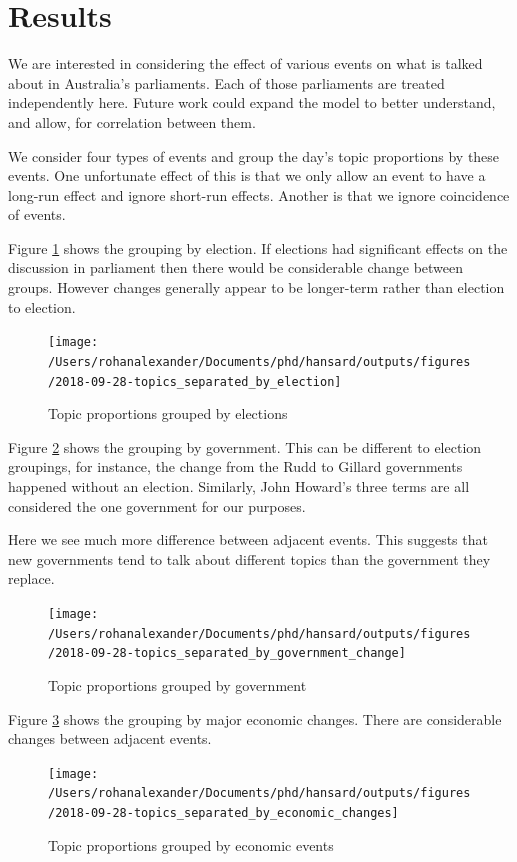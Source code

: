 \documentclass[12pt,]{article}
\theoremstyle{definition}
\theoremstyle{definition}
\theoremstyle{definition}
\theoremstyle{remark}
\begin{document}
\section{Results}\label{results}

We are interested in considering the effect of various events on what is
talked about in Australia's parliaments. Each of those parliaments are
treated independently here. Future work could expand the model to better
understand, and allow, for correlation between them.

We consider four types of events and group the day's topic proportions
by these events. One unfortunate effect of this is that we only allow an
event to have a long-run effect and ignore short-run effects. Another is
that we ignore coincidence of events.

Figure \ref{fig:electionsevents} shows the grouping by election. If
elections had significant effects on the discussion in parliament then
there would be considerable change between groups. However changes
generally appear to be longer-term rather than election to election.

\begin{figure}
\texttt{[image: /Users/rohanalexander/Documents/phd/hansard/outputs/figures/2018-09-28-topics\_separated\_by\_election]} \caption{Topic proportions grouped by elections}\label{fig:electionsevents}
\end{figure}

Figure \ref{fig:governmentevents} shows the grouping by government. This
can be different to election groupings, for instance, the change from
the Rudd to Gillard governments happened without an election. Similarly,
John Howard's three terms are all considered the one government for our
purposes.

Here we see much more difference between adjacent events. This suggests
that new governments tend to talk about different topics than the
government they replace.

\begin{figure}
\texttt{[image: /Users/rohanalexander/Documents/phd/hansard/outputs/figures/2018-09-28-topics\_separated\_by\_government\_change]} \caption{Topic proportions grouped by government}\label{fig:governmentevents}
\end{figure}

Figure \ref{fig:economicevents} shows the grouping by major economic
changes. There are considerable changes between adjacent events.

\begin{figure}
\texttt{[image: /Users/rohanalexander/Documents/phd/hansard/outputs/figures/2018-09-28-topics\_separated\_by\_economic\_changes]} \caption{Topic proportions grouped by economic events}\label{fig:economicevents}
\end{figure}
\end{document}
